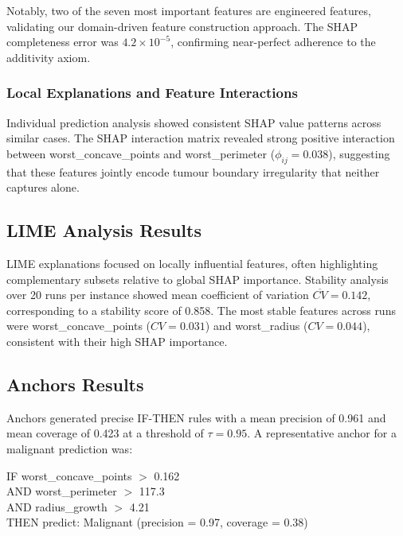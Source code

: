 \documentclass[journal]{IEEEtran}
\begin{document}
Notably, two of the seven most important features are engineered features, validating our domain-driven feature construction approach. The SHAP completeness error was $4.2 \times 10^{-5}$, confirming near-perfect adherence to the additivity axiom.

\subsubsection{Local Explanations and Feature Interactions}

Individual prediction analysis showed consistent SHAP value patterns across similar cases. The SHAP interaction matrix revealed strong positive interaction between worst\_concave\_points and worst\_perimeter ($\phi_{ij} = 0.038$), suggesting that these features jointly encode tumour boundary irregularity that neither captures alone.

\subsection{LIME Analysis Results}

LIME explanations focused on locally influential features, often highlighting complementary subsets relative to global SHAP importance. Stability analysis over 20 runs per instance showed mean coefficient of variation $\overline{CV} = 0.142$, corresponding to a stability score of 0.858. The most stable features across runs were worst\_concave\_points ($CV = 0.031$) and worst\_radius ($CV = 0.044$), consistent with their high SHAP importance.

\subsection{Anchors Results}

Anchors generated precise IF-THEN rules with a mean precision of 0.961 and mean coverage of 0.423 at a threshold of $\tau = 0.95$. A representative anchor for a malignant prediction was:

\begin{tcolorbox}[colback=gray!10, colframe=gray!50, title=Example Anchor Rule (Malignant)]
IF worst\_concave\_points $>$ 0.162 \\
AND worst\_perimeter $>$ 117.3 \\
AND radius\_growth $>$ 4.21 \\
THEN predict: Malignant (precision = 0.97, coverage = 0.38)
\end{tcolorbox}
\end{document}
